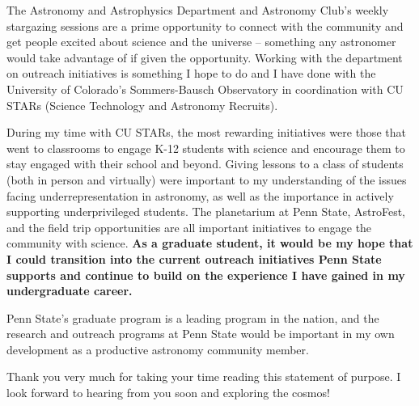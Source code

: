 \documentclass[12pt,letterpaper]{article}
\begin{document}
The Astronomy and Astrophysics Department and Astronomy Club's weekly stargazing sessions are a prime opportunity to connect with the community and get people excited about science and the universe -- something any astronomer would take advantage of if given the opportunity. Working with the department on outreach initiatives is something I hope to do and I have done with the University of Colorado’s Sommers-Bausch Observatory in coordination with CU STARs (Science Technology and Astronomy Recruits).  

During my time with CU STARs, the most rewarding initiatives were those that went to classrooms to engage K-12 students with science and encourage them to stay engaged with their school and beyond. Giving lessons to a class of students (both in person and virtually) were important to my understanding of the issues facing underrepresentation in astronomy, as well as the importance in actively supporting underprivileged students. The planetarium at Penn State, AstroFest, and the field trip opportunities are all important initiatives to engage the community with science. \textbf{As a graduate student, it would be my hope that I could transition into the current outreach initiatives Penn State supports and continue to build on the experience I have gained in my undergraduate career.}

Penn State's graduate program is a leading program in the nation, and the research and outreach programs at Penn State would be important in my own development as a productive astronomy community member.

Thank you very much for taking your time reading this statement of purpose. I look forward to hearing from you soon and exploring the cosmos!
\end{document}
